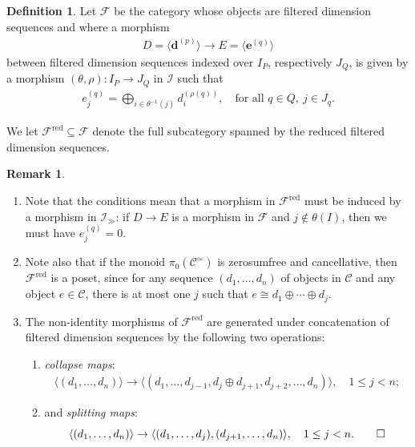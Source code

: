 \documentclass[12pt, reqno]{amsart}
\theoremstyle{plain}
\theoremstyle{definition}
\newtheorem{definition}[theorem]{Definition}
\newtheorem{remark}[theorem]{Remark}
\begin{document}
\begin{definition}
Let $\mathcal{F}$ be the category whose objects are filtered dimension sequences and where a morphism
\begin{align*}
D=\langle \mathbf{d}^{(p)}\rangle \longrightarrow E=\langle \mathbf{e}^{(q)}\rangle
\end{align*}
between filtered dimension sequences indexed over $I_P$, respectively $J_Q$, is given by a morphism $(\theta, \rho)\colon I_P\rightarrow J_Q$ in $\mathcal{I}$ such that
\begin{align*}
e_j^{(q)}=\bigoplus_{i\in \theta^{-1}(j)}d_i^{(\rho(q))},\quad \text{for all }q\in Q, \ j\in J_q.
\end{align*}

We let $\mathcal{F}^{\operatorname{red}}\subseteq \mathcal{F}$ denote the full subcategory spanned by the reduced filtered dimension sequences.
\end{definition}

\begin{remark}\label{splitting maps and collapse maps} \ 
\begin{enumerate}
\item Note that the conditions mean that a morphism in $\mathcal{F}^{\operatorname{red}}$ must be induced by a morphism in $\mathcal{I}_\gg$: if $D\rightarrow E$ is a morphism in $\mathcal{F}$ and $j\notin \theta(I)$, then we must have $e_j^{(q)}=0$.
\item Note also that if the monoid $\pi_0(\mathcal{C}^\simeq)$ is zerosumfree and cancellative, then $\mathcal{F}^{\operatorname{red}}$ is a poset, since for any sequence $(d_1,\ldots,d_n)$ of objects in $\mathcal{C}$ and any object $e\in \mathcal{C}$, there is at most one $j$ such that $e\cong d_1\oplus \cdots \oplus d_j$.
\item The non-identity morphisms of $\mathcal{F}^{\operatorname{red}}$ are generated under concatenation of filtered dimension sequences by the following two operations:
\begin{enumerate}
\item \textit{collapse maps}:
\begin{align*}
\langle(d_1,\ldots,d_n)\rangle\rightarrow \langle(d_1,\ldots,d_{j-1},d_j\oplus d_{j+1},d_{j+2},\ldots,d_n)\rangle, \quad 1\leq j< n;
\end{align*}
\item and \textit{splitting maps}:
\begin{equation*}
\langle(d_1,\ldots,d_n)\rangle\rightarrow \langle(d_1,\ldots,d_j),(d_{j+1},\ldots,d_n)\rangle, \quad 1\leq j< n.\qedhere
\end{equation*}
\end{enumerate}
\end{enumerate}
\end{remark}
\end{document}
